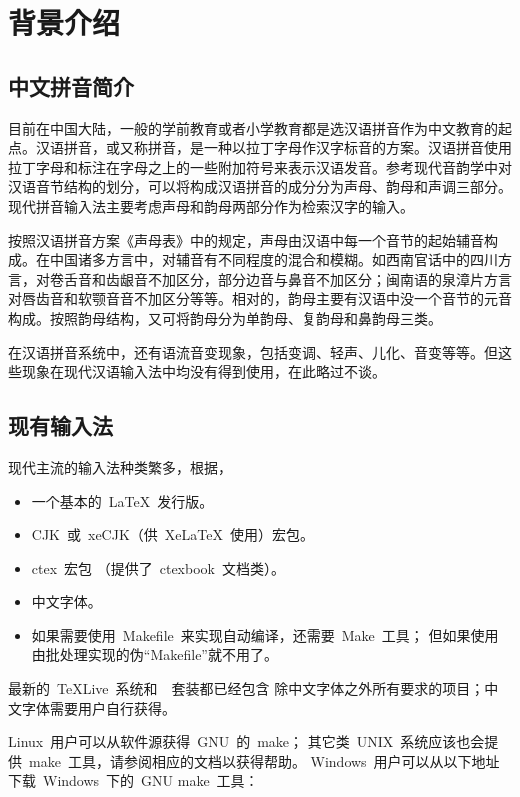 \chapter{背景介绍}
	\section{中文拼音简介}

	目前在中国大陆，一般的学前教育或者小学教育都是选汉语拼音作为中文教育的起点。汉语拼音，或又称拼音，是一种以拉丁字母作汉字标音的方案。\supercite{wjm}汉语拼音使用拉丁字母和标注在字母之上的一些附加符号来表示汉语发音。参考现代音韵学中对汉语音节结构的划分，可以将构成汉语拼音的成分分为声母、韵母和声调三部分。现代拼音输入法主要考虑声母和韵母两部分作为检索汉字的输入。

	按照汉语拼音方案《声母表》中的规定，声母由汉语中每一个音节的起始辅音构成。在中国诸多方言中，对辅音有不同程度的混合和模糊。如西南官话中的四川方言，对卷舌音和齿龈音不加区分，部分边音与鼻音不加区分；闽南语的泉漳片方言对唇齿音和软颚音音不加区分等等。\supercite{jdp}相对的，韵母主要有汉语中没一个音节的元音构成。按照韵母结构，又可将韵母分为单韵母、复韵母和鼻韵母三类。

	在汉语拼音系统中，还有语流音变现象，包括变调、轻声、儿化、音变等等。但这些现象在现代汉语输入法中均没有得到使用，在此略过不谈。

	\section{现有输入法}

	现代主流的输入法种类繁多，根据，
	\begin{itemize}\denselist
		\item 一个基本的~\LaTeX{}~发行版。
		\item CJK~或~xeCJK（供~Xe\LaTeX{}~使用）宏包。
		\item ctex~宏包\supercite{ctex-doc,ctexfaq}%
			（提供了~ctexbook~文档类）。
		\item 中文字体。
		\item 如果需要使用~Makefile~来实现自动编译，还需要~Make~工具；
			但如果使用由批处理实现的伪“Makefile”就不用了。
	\end{itemize}

	最新的~\TeX{}Live~系统和~\CTeX~套装都已经包含%
	除中文字体之外所有要求的项目；中文字体需要用户自行获得。

	Linux~用户可以从软件源获得~GNU~的~make；
	其它类~UNIX~系统应该也会提供~make~工具，请参阅相应的文档以获得帮助。
	Windows~用户可以从以下地址下载~Windows~下的~GNU make~工具：

